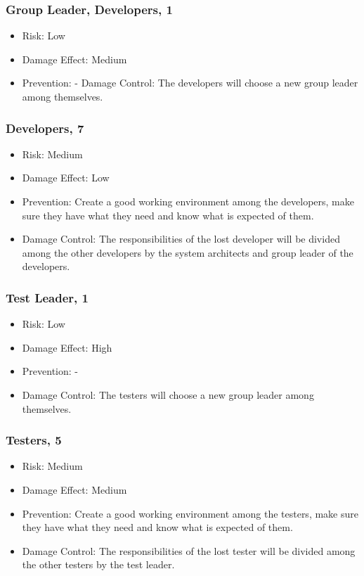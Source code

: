 \documentclass[a4paper]{article}
\begin{document}
\subsubsection{Group Leader, Developers, 1}
\begin{itemize}
\item Risk: Low
\item Damage Effect: Medium
\item Prevention: -
Damage Control: The developers will choose a new group leader among themselves.
\end{itemize}

\subsubsection{Developers, 7}
\begin{itemize}
\item Risk: Medium
\item Damage Effect: Low
\item Prevention: Create a good working environment among the developers, make sure they have what they need and know what is expected of them.
\item Damage Control: The responsibilities of the lost developer will be divided among the other developers by the system architects and group leader of the developers.
\end{itemize}

\subsubsection{Test Leader, 1}
\begin{itemize}
\item Risk: Low
\item Damage Effect: High
\item Prevention: -
\item Damage Control: The testers will choose a new group leader among themselves.
\end{itemize}

\subsubsection{Testers, 5}
\begin{itemize}
\item Risk: Medium
\item Damage Effect: Medium
\item Prevention: Create a good working environment among the testers, make sure they have what they need and know what is expected of them.
\item Damage Control: The responsibilities of the lost tester will be divided among the other testers by the test leader.
\end{itemize}
\end{document}

